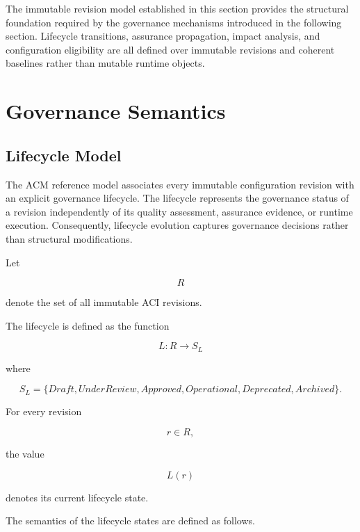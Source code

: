 \documentclass[10pt]{article}
\begin{document}
The immutable revision model established in this section provides the structural foundation required by the governance mechanisms introduced in the following section. Lifecycle transitions, assurance propagation, impact analysis, and configuration eligibility are all defined over immutable revisions and coherent baselines rather than mutable runtime objects.

\section{Governance Semantics}
\subsection{Lifecycle Model}
\label{sec:lifecycle}

The ACM reference model associates every immutable configuration revision with an explicit governance lifecycle. The lifecycle represents the governance status of a revision independently of its quality assessment, assurance evidence, or runtime execution. Consequently, lifecycle evolution captures governance decisions rather than structural modifications.

Let

\[
R
\]

denote the set of all immutable ACI revisions.

The lifecycle is defined as the function

\[
L:R\rightarrow S_L
\]

where

\[
S_L=
\{
Draft,
UnderReview,
Approved,
Operational,
Deprecated,
Archived
\}.
\]

For every revision

\[
r\in R,
\]

the value

\[
L(r)
\]

denotes its current lifecycle state.

The semantics of the lifecycle states are defined as follows.
\end{document}
